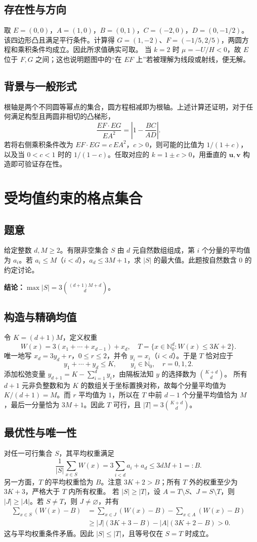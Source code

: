\documentclass[UTF8,11pt,a4paper,fontset=fandol]{ctexart}
\newcommand{\N}{\mathbb N_0}
\newcommand{\ans}[1]{\par\noindent\textcolor{accent}{\textbf{结论：}}#1\par}
\begin{document}
\subsection*{存在性与方向}
取 $E=(0,0)$，$A=(1,0)$，$B=(0,1)$，$C=(-2,0)$，$D=(0,-1/2)$。该四边形凸且满足平行条件。计算得 $G=(1,-2)$、$F=(-1/5,2/5)$，两圆方程和乘积条件均成立。因此所求值确实可取。
当 $k=2$ 时 $\mu=-U/H<0$，故 $E$ 位于 $F,G$ 之间；这也说明题图中的“在 $EF$ 上”若被理解为线段或射线，便无解。
\subsection*{背景与一般形式}
根轴是两个不同圆等幂点的集合，圆方程相减即为根轴。上述计算还证明，对于任何满足构型且两圆非相切的凸梯形，
\[
\frac{EF\cdot EG}{EA^2}
=\left|1-\frac{BC}{AD}\right|.
\]
若将右侧乘积条件改为 $EF\cdot EG=c\,EA^2$，$c>0$，则可能的比值为 $1/(1+c)$，以及当 $0<c<1$ 时的 $1/(1-c)$。任取对应的 $k=1\pm c>0$，用垂直的 $\mathbf u,\mathbf v$ 构造即可验证存在性。

\section{受均值约束的格点集合}
\subsection*{题意}
给定整数 $d,M\ge2$。有限非空集合 $S$ 由 $d$ 元自然数组组成，第 $i$ 个分量的平均值为 $a_i$。若 $a_i\le M$（$i<d$），$a_d\le3M+1$，求 $|S|$ 的最大值。此题按自然数含 $0$ 的约定讨论。
\ans{$\displaystyle \max |S|=3\binom{(d+1)M+d}{d}$。}
\subsection*{构造与精确均值}
令 $K=(d+1)M$，定义权重
\[
W(x)=3(x_1+\cdots+x_{d-1})+x_d,
\quad T=\{x\in\N^d: W(x)\le3K+2\}.
\]
唯一地写 $x_d=3y_d+r$，$0\le r\le2$，并令 $y_i=x_i$（$i<d$）。于是 $T$ 恰对应于
\[
y_1+\cdots+y_d\le K,\qquad y_i\in\N,\quad r=0,1,2.
\]
添加松弛变量 $y_{d+1}=K-\sum_{i=1}^d y_i$，由隔板法知 $y$ 的选择数为 $\binom{K+d}{d}$。
所有 $d+1$ 元非负整数和为 $K$ 的数组关于坐标置换对称，故每个分量平均值为 $K/(d+1)=M$。而 $r$ 平均值为 $1$，所以在 $T$ 中前 $d-1$ 个分量平均值恰为 $M$，最后一分量恰为 $3M+1$。因此 $T$ 可行，且 $|T|=3\binom{K+d}{d}$。
\subsection*{最优性与唯一性}
对任一可行集合 $S$，其平均权重满足
\[
\frac1{|S|}\sum_{x\in S}W(x)
=3\sum_{i<d}a_i+a_d\le3dM+1=:B.
\]
另一方面，$T$ 的平均权重恰为 $B$。注意 $3K+2>B$；所有 $T$ 外的权重至少为 $3K+3$，严格大于 $T$ 内所有权重。
若 $|S|\ge|T|$，设 $A=T\setminus S$、$J=S\setminus T$，则 $|J|\ge|A|$。若 $S\ne T$，则 $J\ne\varnothing$，并有
\[
\begin{aligned}
\sum_{x\in S}(W(x)-B)
&=\sum_{x\in J}(W(x)-B)-\sum_{x\in A}(W(x)-B)\\
&\ge |J|(3K+3-B)-|A|(3K+2-B)>0.
\end{aligned}
\]
这与平均权重条件矛盾。因此 $|S|\le|T|$，且等号仅在 $S=T$ 时成立。
\end{document}
